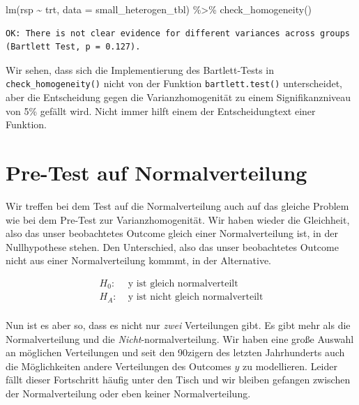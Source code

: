 \documentclass[
  letterpaper,
]{scrbook}
\newenvironment{Shaded}{\begin{snugshade}}{\end{snugshade}}
\newcommand{\AttributeTok}[1]{\textcolor[rgb]{0.40,0.45,0.13}{#1}}
\newcommand{\FunctionTok}[1]{\textcolor[rgb]{0.28,0.35,0.67}{#1}}
\newcommand{\NormalTok}[1]{\textcolor[rgb]{0.00,0.23,0.31}{#1}}
\newcommand{\SpecialCharTok}[1]{\textcolor[rgb]{0.37,0.37,0.37}{#1}}
\begin{document}
\begin{Shaded}
\begin{Highlighting}[]
\FunctionTok{lm}\NormalTok{(rsp }\SpecialCharTok{\textasciitilde{}}\NormalTok{ trt, }\AttributeTok{data =}\NormalTok{ small\_heterogen\_tbl) }\SpecialCharTok{\%\textgreater{}\%} \FunctionTok{check\_homogeneity}\NormalTok{()}
\end{Highlighting}
\end{Shaded}

\begin{verbatim}
OK: There is not clear evidence for different variances across groups (Bartlett Test, p = 0.127).
\end{verbatim}

Wir sehen, dass sich die Implementierung des Bartlett-Tests in
\texttt{check\_homogeneity()} nicht von der Funktion
\texttt{bartlett.test()} unterscheidet, aber die Entscheidung gegen die
Varianzhomogenität zu einem Signifikanzniveau von 5\% gefällt wird.
Nicht immer hilft einem der Entscheidungtext einer Funktion.

\hypertarget{pre-test-auf-normalverteilung}{%
\section{Pre-Test auf
Normalverteilung}\label{pre-test-auf-normalverteilung}}

Wir treffen bei dem Test auf die Normalverteilung auch auf das gleiche
Problem wie bei dem Pre-Test zur Varianzhomogenität. Wir haben wieder
die Gleichheit, also das unser beobachtetes Outcome gleich einer
Normalverteilung ist, in der Nullhypothese stehen. Den Unterschied, also
das unser beobachtetes Outcome nicht aus einer Normalverteilung kommmt,
in der Alternative.

\[
\begin{align*}
H_0: &\; \mbox{y ist gleich normalverteilt}\\
H_A: &\; \mbox{y ist nicht gleich normalverteilt}\\
\end{align*}
\]

Nun ist es aber so, dass es nicht nur \emph{zwei} Verteilungen gibt. Es
gibt mehr als die Normalverteilung und die
\emph{Nicht}-normalverteilung. Wir haben eine große Auswahl an möglichen
Verteilungen und seit den 90zigern des letzten Jahrhunderts auch die
Möglichkeiten andere Verteilungen des Outcomes \(y\) zu modellieren.
Leider fällt dieser Fortschritt häufig unter den Tisch und wir bleiben
gefangen zwischen der Normalverteilung oder eben keiner
Normalverteilung.
\end{document}
